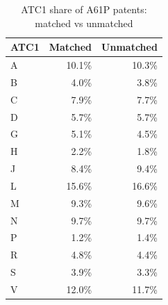 \begin{table}[!h]
\centering
\caption{\label{tab:patent_matching_atc}ATC1 share of A61P patents: matched vs unmatched}
\centering
\begin{tabular*}{\textwidth}{l@{\extracolsep{\fill}}rr}
\toprule
ATC1 & Matched & Unmatched \\
\midrule
A & 10.1\% & 10.3\% \\
B & 4.0\% & 3.8\% \\
C & 7.9\% & 7.7\% \\
D & 5.7\% & 5.7\% \\
G & 5.1\% & 4.5\% \\
H & 2.2\% & 1.8\% \\
J & 8.4\% & 9.4\% \\
L & 15.6\% & 16.6\% \\
M & 9.3\% & 9.6\% \\
N & 9.7\% & 9.7\% \\
P & 1.2\% & 1.4\% \\
R & 4.8\% & 4.4\% \\
S & 3.9\% & 3.3\% \\
V & 12.0\% & 11.7\% \\
\bottomrule
\end{tabular*}
\end{table}

